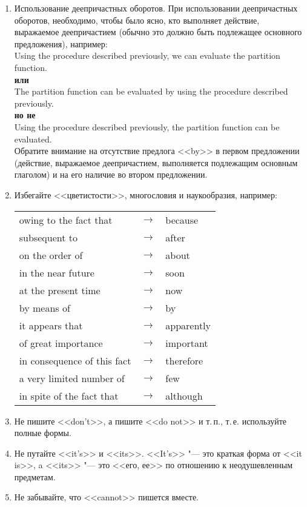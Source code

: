 \documentclass[a5paper, 10pt, twoside, numbers=enddot]{scrartcl}
\newcommand{\ie}{т.\,е.\xspace}
\begin{document}
\begin{enumerate}
  \item Использование деепричастных оборотов. При использовании деепричастных оборотов, необходимо,
    чтобы было ясно, кто выполняет действие, выражаемое деепричастием (обычно это должно быть
    подлежащее основного предложения), например:\\ [4pt]
    \textsf{
      Using the procedure described previously, we can evaluate the partition function.\\ [4pt]
      \textbf{или}\\ [4pt]
      The partition function can be evaluated by using the procedure described previously.\\ [4pt]
      \textbf{но не}\\ [4pt]
      Using the procedure described previously, the partition function can be evaluated.\\ [4pt]
    }
    Обратите внимание на отсутствие предлога <<by>> в первом предложении (действие, выражаемое
    деепричастием, выполняется подлежащим основным глаголом) и на его наличие во втором предложении.

  \item Избегайте <<цветистости>>, многословия и наукообразия, например:
    \begin{center}
      \sffamily
      \begin{tabular}{lll}
        owing to the fact that      & $\rightarrow$ & because\\
        subsequent to               & $\rightarrow$ & after\\
        on the order of             & $\rightarrow$ & about\\
        in the near future          & $\rightarrow$ & soon\\
        at the present time         & $\rightarrow$ & now\\
        by means of                 & $\rightarrow$ & by\\
        it appears that             & $\rightarrow$ & apparently\\
        of great importance         & $\rightarrow$ & important\\
        in consequence of this fact & $\rightarrow$ & therefore\\
        a very limited number of    & $\rightarrow$ & few\\
        in spite of the fact that   & $\rightarrow$ & although
      \end{tabular}
    \end{center}

  \item Не пишите <<don't>>, а пишите <<do not>> и т.\,п., \ie используйте полные формы.

  \item Не путайте <<it's>> и <<its>>. <<It's>> "--- это краткая форма от <<it is>>, a <<its>> "---
    это <<его, ее>> по отношению к неодушевленным предметам.

  \item Не забывайте, что <<cannot>> пишется вместе.
\end{enumerate}
\end{document}
